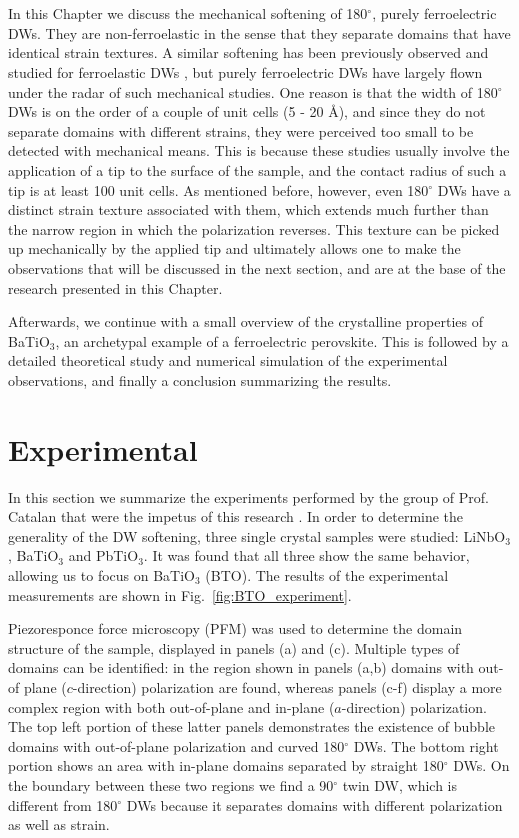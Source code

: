 \\\\
In this Chapter we discuss the mechanical softening of 180$^\circ$, purely ferroelectric DWs. They are non-ferroelastic in the sense that they separate domains that have identical strain textures.
A similar softening has been previously observed and studied for ferroelastic DWs \cite{Lee2003,Scott2012}, but purely ferroelectric DWs have largely flown under the radar of such mechanical studies.
One reason is that the width of 180$^\circ$ DWs is on the order of a couple of unit cells (5 - 20 \AA \cite{Zhirnov1959}), and since they do not separate domains with different strains, they were perceived too small to be detected with mechanical means.
This is because these studies usually involve the application of a tip to the surface of the sample, and the contact radius of such a tip is at least 100 unit cells.
As mentioned before, however, even 180$^\circ$ DWs have a distinct strain texture associated with them, which extends much further than the narrow region in which the polarization reverses.
This texture can be picked up mechanically by the applied tip and ultimately allows one to make the observations that will be discussed in the next section, and are at the base of the research presented in this Chapter.

Afterwards, we continue with a small overview of the crystalline properties of BaTiO$_3$, an archetypal example of a ferroelectric perovskite.
This is followed by a detailed theoretical study and numerical simulation of the experimental observations, and finally a conclusion summarizing the results.

\section{Experimental}
In this section we summarize the experiments performed by the group of Prof. Catalan that were the impetus of this research \cite{Stefani2020}.
In order to determine the generality of the DW softening, three single crystal samples were studied: LiNbO$_3$, BaTiO$_3$ and PbTiO$_3$. It was found that all three show the same behavior, allowing us to focus on BaTiO$_3$ (BTO).
The results of the experimental measurements are shown in Fig.~\ref{fig:BTO_experiment}.

Piezoresponce force microscopy (PFM)\cite{Harnagea2001} was used to determine the domain structure of the sample, displayed in panels (a) and (c).
Multiple types of domains can be identified: in the region shown in panels (a,b) domains with out-of plane ($c$-direction) polarization are found, whereas panels (c-f) display a more complex region with both out-of-plane and in-plane ($a$-direction) polarization.
The top left portion of these latter panels demonstrates the existence of bubble domains with out-of-plane polarization and curved 180$^\circ$ DWs.
The bottom right portion shows an area with in-plane domains separated by straight 180$^\circ$ DWs.
On the boundary between these two regions we find a 90$^\circ$ twin DW, which is different from 180$^\circ$ DWs because it separates domains with different polarization as well as strain.

